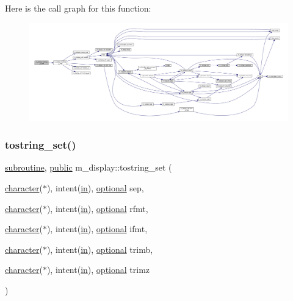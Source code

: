 Here is the call graph for this function\+:
\nopagebreak
\begin{figure}[H]
\begin{center}
\leavevmode
\includegraphics[width=350pt]{namespacem__display_a05b3cac8d4c04e08dc99c7c23f1254ba_cgraph}
\end{center}
\end{figure}
\mbox{\label{namespacem__display_ac6d80df8c70bb7d64df528d26851d6cb}} 
\subsubsection{\texorpdfstring{tostring\+\_\+set()}{tostring\_set()}}
{\footnotesize\ttfamily \hyperlink{M__stopwatch_83_8txt_acfbcff50169d691ff02d4a123ed70482}{subroutine}, \hyperlink{M__stopwatch_83_8txt_a2f74811300c361e53b430611a7d1769f}{public} m\+\_\+display\+::tostring\+\_\+set (\begin{DoxyParamCaption}\item[{\hyperlink{option__stopwatch_83_8txt_abd4b21fbbd175834027b5224bfe97e66}{character}($\ast$), intent(\hyperlink{M__journal_83_8txt_afce72651d1eed785a2132bee863b2f38}{in}), \hyperlink{option__stopwatch_83_8txt_aa4ece75e7acf58a4843f70fe18c3ade5}{optional}}]{sep,  }\item[{\hyperlink{option__stopwatch_83_8txt_abd4b21fbbd175834027b5224bfe97e66}{character}($\ast$), intent(\hyperlink{M__journal_83_8txt_afce72651d1eed785a2132bee863b2f38}{in}), \hyperlink{option__stopwatch_83_8txt_aa4ece75e7acf58a4843f70fe18c3ade5}{optional}}]{rfmt,  }\item[{\hyperlink{option__stopwatch_83_8txt_abd4b21fbbd175834027b5224bfe97e66}{character}($\ast$), intent(\hyperlink{M__journal_83_8txt_afce72651d1eed785a2132bee863b2f38}{in}), \hyperlink{option__stopwatch_83_8txt_aa4ece75e7acf58a4843f70fe18c3ade5}{optional}}]{ifmt,  }\item[{\hyperlink{option__stopwatch_83_8txt_abd4b21fbbd175834027b5224bfe97e66}{character}($\ast$), intent(\hyperlink{M__journal_83_8txt_afce72651d1eed785a2132bee863b2f38}{in}), \hyperlink{option__stopwatch_83_8txt_aa4ece75e7acf58a4843f70fe18c3ade5}{optional}}]{trimb,  }\item[{\hyperlink{option__stopwatch_83_8txt_abd4b21fbbd175834027b5224bfe97e66}{character}($\ast$), intent(\hyperlink{M__journal_83_8txt_afce72651d1eed785a2132bee863b2f38}{in}), \hyperlink{option__stopwatch_83_8txt_aa4ece75e7acf58a4843f70fe18c3ade5}{optional}}]{trimz }\end{DoxyParamCaption})}



